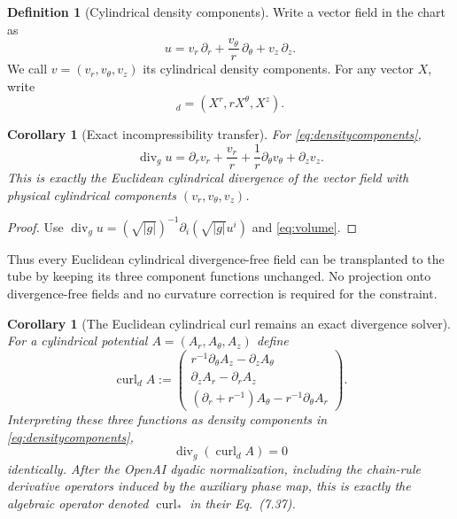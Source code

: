 \documentclass[aps,prd,reprint,superscriptaddress,nofootinbib,floatfix]{revtex4-2}
\newtheorem{corollary}[theorem]{Corollary}
\theoremstyle{definition}
\newtheorem{definition}[theorem]{Definition}
\theoremstyle{remark}
\newcommand{\divg}{\operatorname{div}_g}
\begin{document}
\begin{definition}[Cylindrical density components]\label{def:density}
	Write a vector field in the chart as
	\begin{equation}
		u=v_r\,\partial_r+\frac{v_\theta}{r}\,\partial_\theta+v_z\,\partial_z.
		\label{eq:densitycomponents}
	\end{equation}
	We call $v=(v_r,v_\theta,v_z)$ its cylindrical density components. For any vector $X$, write
	\begin{equation}
		[X]_d=(X^r,rX^\theta,X^z).
	\end{equation}
\end{definition}

\begin{corollary}[Exact incompressibility transfer]\label{cor:div}
	For \cref{eq:densitycomponents},
	\begin{equation}
		\divg u=
		\partial_r v_r+\frac{v_r}{r}+\frac1r\partial_\theta v_\theta+\partial_z v_z.
		\label{eq:divexact}
	\end{equation}
	This is exactly the Euclidean cylindrical divergence of the vector field with physical cylindrical components $(v_r,v_\theta,v_z)$.
\end{corollary}

\begin{proof}
	Use $\operatorname{div}_g u=(\sqrt{|g|})^{-1}\partial_i(\sqrt{|g|}u^i)$ and \cref{eq:volume}.
\end{proof}

Thus every Euclidean cylindrical divergence-free field can be transplanted to the tube by keeping its three component functions unchanged. No projection onto divergence-free fields and no curvature correction is required for the constraint.

\begin{corollary}[The Euclidean cylindrical curl remains an exact divergence solver]\label{cor:curl}
	For a cylindrical potential $A=(A_r,A_\theta,A_z)$ define
	\begin{equation}
		\operatorname{curl}_d A:=
		\begin{pmatrix}
			r^{-1}\partial_\theta A_z-\partial_zA_\theta \\
			\partial_zA_r-\partial_rA_z                  \\
			(\partial_r+r^{-1})A_\theta-r^{-1}\partial_\theta A_r
		\end{pmatrix}.
		\label{eq:curlDensity}
	\end{equation}
	Interpreting these three functions as density components in \cref{eq:densitycomponents},
	\begin{equation}
		\divg(\operatorname{curl}_d A)=0
	\end{equation}
	identically. After the OpenAI dyadic normalization, including the chain-rule derivative operators induced by the auxiliary phase map, this is exactly the algebraic operator denoted $\operatorname{curl}_*$ in their Eq.~(7.37).
\end{corollary}
\end{document}
